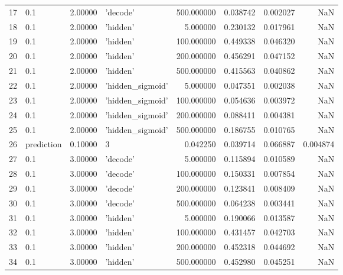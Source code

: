 \documentclass[10pt,a4paper]{article}
\begin{document}
\begin{tabular}{llrlrrrr}
17   &         0.1 &   2.00000 &           'decode' &  500.000000 &  0.038742 &  0.002027 &       NaN \\
18   &         0.1 &   2.00000 &           'hidden' &    5.000000 &  0.230132 &  0.017961 &       NaN \\
19   &         0.1 &   2.00000 &           'hidden' &  100.000000 &  0.449338 &  0.046320 &       NaN \\
20   &         0.1 &   2.00000 &           'hidden' &  200.000000 &  0.456291 &  0.047152 &       NaN \\
21   &         0.1 &   2.00000 &           'hidden' &  500.000000 &  0.415563 &  0.040862 &       NaN \\
22   &         0.1 &   2.00000 &   'hidden\_sigmoid' &    5.000000 &  0.047351 &  0.002038 &       NaN \\
23   &         0.1 &   2.00000 &   'hidden\_sigmoid' &  100.000000 &  0.054636 &  0.003972 &       NaN \\
24   &         0.1 &   2.00000 &   'hidden\_sigmoid' &  200.000000 &  0.088411 &  0.004381 &       NaN \\
25   &         0.1 &   2.00000 &   'hidden\_sigmoid' &  500.000000 &  0.186755 &  0.010765 &       NaN \\
26   &  prediction &   0.10000 &                  3 &    0.042250 &  0.039714 &  0.066887 &  0.004874 \\
27   &         0.1 &   3.00000 &           'decode' &    5.000000 &  0.115894 &  0.010589 &       NaN \\
28   &         0.1 &   3.00000 &           'decode' &  100.000000 &  0.150331 &  0.007854 &       NaN \\
29   &         0.1 &   3.00000 &           'decode' &  200.000000 &  0.123841 &  0.008409 &       NaN \\
30   &         0.1 &   3.00000 &           'decode' &  500.000000 &  0.064238 &  0.003441 &       NaN \\
31   &         0.1 &   3.00000 &           'hidden' &    5.000000 &  0.190066 &  0.013587 &       NaN \\
32   &         0.1 &   3.00000 &           'hidden' &  100.000000 &  0.431457 &  0.042703 &       NaN \\
33   &         0.1 &   3.00000 &           'hidden' &  200.000000 &  0.452318 &  0.044692 &       NaN \\
34   &         0.1 &   3.00000 &           'hidden' &  500.000000 &  0.452980 &  0.045251 &       NaN \\

\end{tabular}
\end{document}
